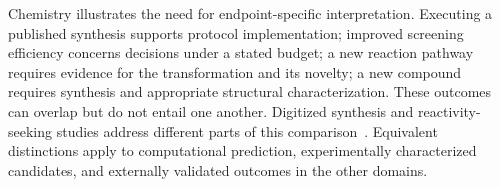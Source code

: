 Chemistry illustrates the need for endpoint-specific interpretation. Executing a published synthesis supports protocol implementation; improved screening efficiency concerns decisions under a stated budget; a new reaction pathway requires evidence for the transformation and its novelty; a new compound requires synthesis and appropriate structural characterization. These outcomes can overlap but do not entail one another. Digitized synthesis and reactivity-seeking studies address different parts of this comparison~\cite{asd0600,asd0734,asd0428}. Equivalent distinctions apply to computational prediction, experimentally characterized candidates, and externally validated outcomes in the other domains.
